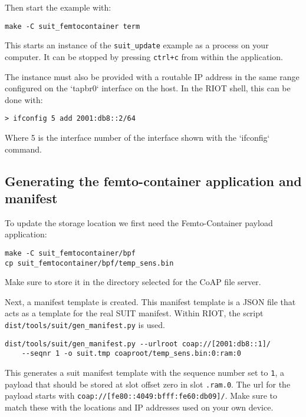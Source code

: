 \documentclass[../main.tex]{subfiles}
\begin{document}
Then start the example with:

\begin{lstlisting}
make -C suit_femtocontainer term
\end{lstlisting}

This starts an instance of the \texttt{suit\_update} example as a process on your
computer. It can be stopped by pressing \texttt{ctrl+c} from within the application.

The instance must also be provided with a routable IP address in the same range
configured on the `tapbr0` interface on the host. In the RIOT shell, this can be
done with:

\begin{lstlisting}
> ifconfig 5 add 2001:db8::2/64
\end{lstlisting}

Where 5 is the interface number of the interface shown with the `ifconfig`
command.

\subsection{Generating the femto-container application and manifest}

To update the storage location we first need the Femto-Container payload
application:

\begin{lstlisting}
make -C suit_femtocontainer/bpf
cp suit_femtocontainer/bpf/temp_sens.bin
\end{lstlisting}

Make sure to store it in the directory selected for the CoAP file server.

Next, a manifest template is created. This manifest template is a JSON file that
acts as a template for the real SUIT manifest. Within RIOT, the script
\texttt{dist/tools/suit/gen\_manifest.py} is used.

\begin{lstlisting}
dist/tools/suit/gen_manifest.py --urlroot coap://[2001:db8::1]/
	--seqnr 1 -o suit.tmp coaproot/temp_sens.bin:0:ram:0
\end{lstlisting}

This generates a suit manifest template with the sequence number set to \texttt{1}, a
payload that should be stored at slot offset zero in slot \texttt{.ram.0}. The url for
the payload starts with \texttt{coap://[fe80::4049:bfff:fe60:db09]/}. Make sure to
match these with the locations and IP addresses used on your own device.
\end{document}

